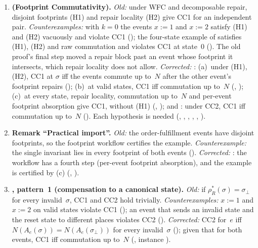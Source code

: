\documentclass[11pt,a4paper]{article}
\theoremstyle{plain}
\theoremstyle{definition}
\theoremstyle{remark}
\begin{document}
\begin{enumerate}[leftmargin=*,label=\textbf{E\arabic*.},ref=E\arabic*]
\item \textbf{ (Footprint Commutativity).}
  \emph{Old:} under WFC and decomposable repair, disjoint footprints (H1) and
  repair locality (H2) give CC1 for an independent pair.
  \emph{Counterexamples:} with $k = 0$ the events $x := 1$ and $x := 2$
  satisfy (H1) and (H2) vacuously and violate CC1
  (); the four-state example of
   satisfies (H1), (H2) and raw
  commutation and violates CC1 at state~0
  ().  The old proof's final step
  moved a repair block past an event whose footprint it intersects, which
  repair locality does not allow.
  \emph{Corrected:} : (a)~under (H1), (H2), CC1 at
  $\sigma$ iff the events commute up to~$N$ after the other event's footprint
  repairs (); (b)~at valid states, CC1 iff
  commutation up to~$N$ (,
  ); (c)~at every state, repair locality,
  commutation up to~$N$ and per-event footprint absorption give CC1, without
  (H1) (, ); and
  : under CC2, CC1 iff commutation up to~$N$
  ().  Each hypothesis is needed
  (, ,
  , ,
  , ).

\item \textbf{Remark ``Practical import''.}
  \emph{Old:} the order-fulfillment events have disjoint footprints, so the
  footprint workflow certifies the example.
  \emph{Counterexample:} the single invariant lies in every footprint of both
  events ().
  \emph{Corrected:} : the workflow has a fourth
  step (per-event footprint absorption), and the example is certified by
  (c) (,
  ).

\item \textbf{, pattern~1 (compensation to a canonical
  state).}
  \emph{Old:} if $\rho_R^*(\sigma) = \sigma_\bot$ for every invalid~$\sigma$,
  CC1 and CC2 hold trivially.
  \emph{Counterexamples:} $x := 1$ and $x := 2$ on valid states violate CC1
  (); an event that sends an invalid state and
  the reset state to different places violates CC2
  ().
  \emph{Corrected:} CC2 for~$e$ iff $N(A_e(\sigma)) = N(A_e(\sigma_\bot))$ for
  every invalid~$\sigma$ (); given that for both
  events, CC1 iff commutation up to~$N$ (,
  instance ).


\end{enumerate}
\end{document}
